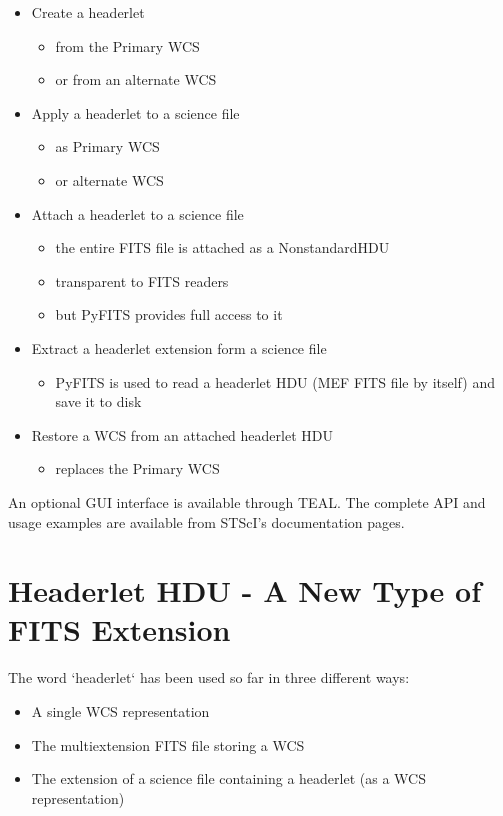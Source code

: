 \begin{itemize}
\item Create a headerlet
\begin{itemize}
  \item from the Primary WCS
  \item or from an alternate WCS
\end{itemize}
\item Apply a headerlet to a science file
\begin{itemize}
  \item as Primary WCS
  \item or alternate WCS
\end{itemize}
\item Attach a headerlet to a science file
\begin{itemize}
  \item the entire FITS file is attached as a NonstandardHDU
  \item transparent to FITS readers
  \item but PyFITS provides full access to it
\end{itemize}
\item Extract a headerlet extension form a science file
\begin{itemize}
  \item PyFITS is used to read a headerlet HDU (MEF FITS file by itself) and save it to disk
\end{itemize}
\item Restore a WCS from an attached headerlet HDU
\begin{itemize}
  \item replaces the Primary WCS
\end{itemize}
\end{itemize}

An optional GUI interface is available through TEAL.
The complete API and usage examples are available from STScI's documentation pages.

\section{Headerlet HDU - A New Type of FITS Extension}
The word `headerlet` has been used so far in three different ways:

\begin{itemize}
\item A single WCS representation
\item The multiextension FITS file storing a WCS
\item The extension of a science file containing a headerlet (as a WCS representation)
\end{itemize}

